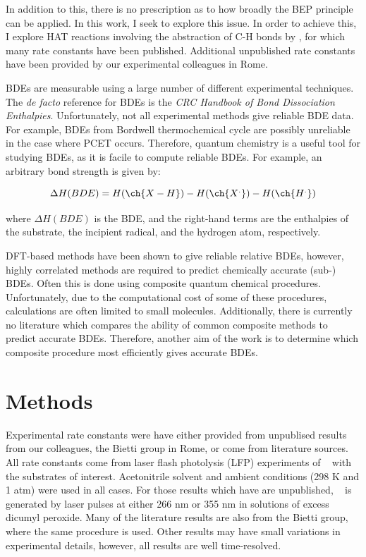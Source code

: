 In addition to this, there is no prescription as to how broadly the BEP principle can be applied. In this work, I seek to explore this issue. In order to achieve this, I explore HAT reactions involving the abstraction of C-H bonds by \cumo, for which many rate constants have been published.\cite{Bietti2010, Bietti2011, Pischel2001, Salamone2011, Salamone2012, Salamone2012a, Salamone2013, Salamone2015} Additional unpublished rate constants have been provided by our experimental colleagues in Rome.

BDEs are measurable using a large number of different experimental techniques. The \emph{de facto} reference for BDEs is the \emph{CRC Handbook of Bond Dissociation Enthalpies}.\cite{Luo2002} Unfortunately, not all experimental methods give reliable BDE data. For example, BDEs from Bordwell\cite{Bordwell1988} thermochemical cycle are possibly unreliable in the case where PCET occurs.\cite{Miller2016} Therefore, quantum chemistry is a useful tool for studying BDEs, as it is facile to compute reliable BDEs. For example, an arbitrary  bond strength is given by:

\begin{equation}
  \Delta H(BDE) = H(\ch{X-H}) - H(\ch{X^.}) - H(\ch{H^.})
\end{equation}

\noindent where $\Delta H(BDE)$ is the BDE, and the right-hand terms are the enthalpies of the substrate, the incipient radical, and the hydrogen atom, respectively.

DFT-based methods have been shown to give reliable relative BDEs, however, highly correlated methods are required to predict chemically accurate (sub-\kcalmol) BDEs.\cite{DiLabio1999, Chan2012, Wiberg2014} Often this is done using composite quantum chemical procedures. Unfortunately, due to the computational cost of some of these procedures, calculations are often limited to small molecules. Additionally, there is currently no literature which compares the ability of common composite methods to predict accurate BDEs. Therefore, another aim of the work is to determine which composite procedure most efficiently gives accurate BDEs.

\section{Methods}

Experimental rate constants were have either provided from unpublised results from our colleagues, the Bietti group in Rome, or come from literature sources.\cite{Bietti2010, Bietti2011, Pischel2001, Salamone2011, Salamone2012, Salamone2012a, Salamone2013, Salamone2015} All rate constants come from laser flash photolysis (LFP) experiments of \cumo~ with the substrates of interest. Acetonitrile solvent and ambient conditions (298 K and 1 atm) were used in all cases. For those results which have are unpublished, \cumo~ is generated by laser pulses at either 266 nm or 355 nm in solutions of excess dicumyl peroxide. Many of the literature results are also from the Bietti group, where the same procedure is used. Other results may have small variations in experimental details, however, all results are well time-resolved.

